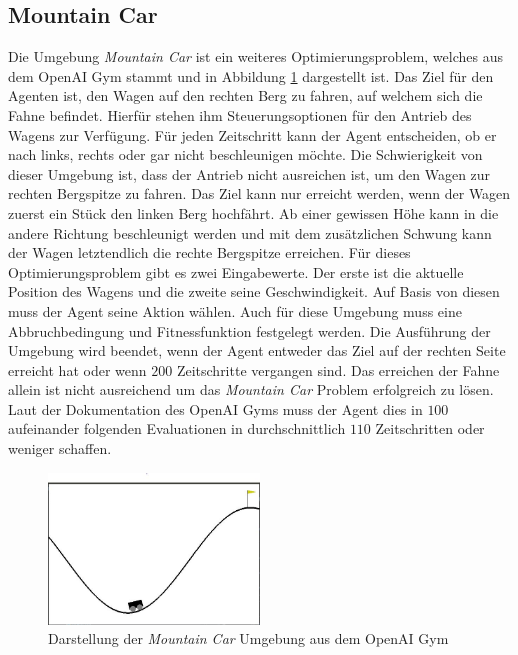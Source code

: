 \subsection{Mountain Car}
Die Umgebung \emph{Mountain Car} ist ein weiteres Optimierungsproblem, welches aus dem OpenAI Gym stammt und in Abbildung \ref{fig:mountain_car_env} dargestellt ist. Das Ziel für den Agenten ist, den Wagen auf den rechten Berg zu fahren, auf welchem sich die Fahne befindet. Hierfür stehen ihm Steuerungsoptionen für den Antrieb des Wagens zur Verfügung. Für jeden Zeitschritt kann der Agent entscheiden, ob er nach links, rechts oder gar nicht beschleunigen möchte. Die Schwierigkeit von dieser Umgebung ist, dass der Antrieb nicht ausreichen ist, um den Wagen zur rechten Bergspitze zu fahren. Das Ziel kann nur erreicht werden, wenn der Wagen zuerst ein Stück den linken Berg hochfährt. Ab einer gewissen Höhe kann in die andere Richtung beschleunigt werden und mit dem zusätzlichen Schwung kann der Wagen letztendlich die rechte Bergspitze erreichen. Für dieses Optimierungsproblem gibt es zwei Eingabewerte. Der erste ist die aktuelle Position des Wagens und die zweite seine Geschwindigkeit. Auf Basis von diesen muss der Agent seine Aktion wählen. Auch für diese Umgebung muss eine Abbruchbedingung und Fitnessfunktion festgelegt werden. Die Ausführung der Umgebung wird beendet, wenn der Agent entweder das Ziel auf der rechten Seite erreicht hat oder wenn $200$ Zeitschritte vergangen sind. Das erreichen der Fahne allein ist nicht ausreichend um das \emph{Mountain Car} Problem erfolgreich zu lösen. Laut der Dokumentation des OpenAI Gyms muss der Agent dies in $100$ aufeinander folgenden Evaluationen in durchschnittlich $110$ Zeitschritten oder weniger schaffen.
\begin{figure}[!h]
	\centering
	\includegraphics[width=0.5\textwidth]{./img/mountain_car_env.JPG} 
	\caption{Darstellung der \emph{Mountain Car} Umgebung aus dem OpenAI Gym}
	\label{fig:mountain_car_env}
\end{figure} 
\\\\
